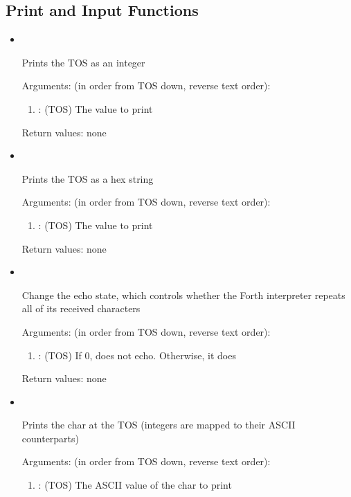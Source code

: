\subsection{Print and Input Functions}
\begin{itemize}

\item {}\ 

\noindent Prints the TOS as an integer

\noindent Arguments: (in order from TOS down, reverse text order):
\begin{enumerate}
\item {}: (TOS) The value to print
\end{enumerate}

\noindent Return values: none

\item {}\ 

\noindent Prints the TOS as a hex string

\noindent Arguments: (in order from TOS down, reverse text order):
\begin{enumerate}
\item {}: (TOS) The value to print
\end{enumerate}

\noindent Return values: none

\item {}\ 

\noindent Change the echo state, which controls whether the Forth interpreter repeats all of its received characters

\noindent Arguments: (in order from TOS down, reverse text order):
\begin{enumerate}
\item {}: (TOS) If 0, does not echo. Otherwise, it does
\end{enumerate}

\noindent Return values: none

\item {}\ 

\noindent Prints the char at the TOS (integers are mapped to their ASCII counterparts)

\noindent Arguments: (in order from TOS down, reverse text order):
\begin{enumerate}
\item {}: (TOS) The ASCII value of the char to print
\end{enumerate}


\end{itemize}
